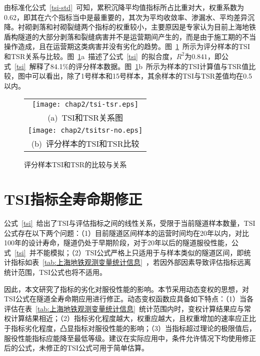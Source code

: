 由标准化公式~\ref{tsi-std}~可知，累积沉降平均值指标所占比重对大，权重系数为0.62，即其在六个指标当中是最重要的，其次为平均收敛率、渗漏水、平均差异沉降。衬砌剥落和衬砌裂缝两个指标的权重较小，主要原因是专家认为目前上海地铁盾构隧道的大部分剥落和裂缝病害并不是运营期间产生的，而是由于施工期的不当操作造成，且在运营期这类病害并没有劣化的趋势。图~\ref{fig:TSI和TSR的比较与关系}~所示为评分样本的TSI和TSR关系与比较。图~\ref{fig:TSI和TSR的比较与关系}a~描述了公式~\ref{tsi}~的拟合度，$R^2$为$0.841$，即公式~\ref{tsi}~解释了84.1\%的评分样本数据。图~\ref{fig:TSI和TSR的比较与关系}b~所示为样本的TSI计算值与TSR值比较，图中可以看出，除了1号样本和15号样本，其余样本的TSI与TSR差值均在0.5以内。

\begin{figure}[htb!] 
    \centering 
    \begin{tabular}{c} 
        \texttt{[image: chap2/tsi-tsr.eps]} \\ 
        (a)~TSI和TSR关系图 \\
        \texttt{[image: chap2/tsitsr-no.eps]} \\ 
        (b)~评分样本的TSI和TSR比较 \\
    \end{tabular}
    \caption{评分样本TSI和TSR的比较与关系} 
    \label{fig:TSI和TSR的比较与关系} 
\end{figure}

\section{TSI指标全寿命期修正}

公式~\ref{tsi}~给出了TSI与评估指标之间的线性关系，受限于当前隧道样本数量，TSI公式存在以下两个问题：（1）目前隧道区间样本的运营时间均在20年以内，对比100年的设计寿命，隧道仍处于早期阶段，对于20年以后的隧道服役性能，公式~\ref{tsi}~并不能模拟；（2）TSI公式严格上只适用于与样本类似的隧道区间，即统计指标如表~\ref{tab:上海地铁观测变量统计信息}~，若因外部因素导致评估指标远离统计范围，TSI公式也将不适用。

因此，本文研究了指标的劣化对服役性能的影响。本节采用动态变权的思想，对TSI公式在隧道全寿命期应用进行修正。动态变权函数应具备如下特点：（1）当各评估在表~\ref{tab:上海地铁观测变量统计信息}~统计范围内时，变权计算结果应与常权计算结果相近；（2）指标劣化程度越大，权重应越大，且权重增加的速率应正比于指标劣化程度，凸显指标对服役性能的影响；（3）当指标超过理论的极限值后，服役性能指标应能降至最低等级。建议在实际应用中，条件允许情况下均使用修正后的公式，未修正的TSI公式可用于简单估算。

